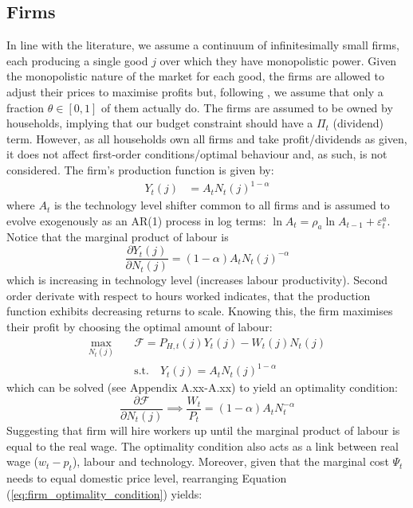 \subsection{Firms}
In line with the literature, we assume a continuum of infinitesimally small firms, each producing a single good $j$ over which they have monopolistic power. Given the monopolistic nature of the market for each good, the firms are allowed to adjust their prices to maximise profits but, following \textcite{calvo_1983_staggered}, we assume that only a fraction $\theta \in [0,1]$ of them actually do. The firms are assumed to be owned by households, implying that our budget constraint should have a $\Pi_t$ (dividend) term. However, as all households own all firms and take profit/dividends as given, it does not affect first-order conditions/optimal behaviour and, as such, is not considered. The firm's production function is given by: 
\begin{align}
    Y_t(j)   & = A_t {N_t(j)}^{1-\alpha}                         
\end{align}
where $A_t$ is the technology level shifter common to all firms and is assumed to evolve exogenously as an AR(1) process in log terms: $\ln A_t = \rho_a \ln A_{t-1} + \varepsilon^a_t$. Notice that the marginal product of labour is
\begin{equation}
    \frac{\partial Y_t(j)}{\partial N_t(j)} = (1-\alpha)A_t {N_t(j)}^{-\alpha}
\end{equation}
which is increasing in technology level (increases labour productivity). Second order derivate with respect to hours worked indicates, that the production function exhibits decreasing returns to scale. Knowing this, the firm maximises their profit by choosing the optimal amount of labour:
\begin{align}
    \max_{N_t(j)}             \quad & \mathcal{F} = P_{H,t}(j)Y_{t}(j) - W_t(j)N_{t}(j) \\
     & \text{s.t.} \quad  Y_t(j)    = A_t {N_t(j)}^{1-\alpha}     
\end{align}
which can be solved (see Appendix A.xx-A.xx) to yield an optimality condition:
\begin{equation}
    \frac{\partial \mathcal{F}}{\partial N_t(j)} \implies \frac{W_t}{P_t} = (1-\alpha)A_t N_t^{-\alpha} \label{eq:firm_optimality_condition}
\end{equation}
Suggesting that firm will hire workers up until the marginal product of labour is equal to the real wage. The optimality condition also acts as a link between real wage ($w_t - p_t$), labour and technology. Moreover, given that the marginal cost $\Psi_t$ needs to equal domestic price level, rearranging Equation (\ref{eq:firm_optimality_condition}) yields: 

